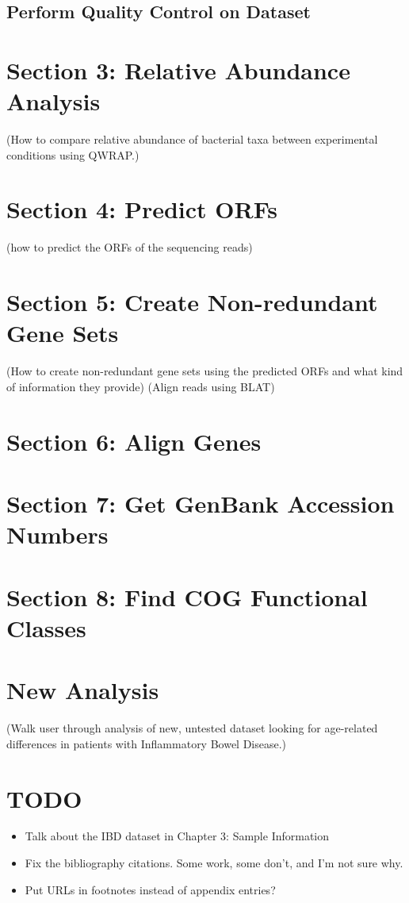     
    \section{Perform Quality Control on Dataset}



\chapter{Section 3: Relative Abundance Analysis}
(How to compare relative abundance of bacterial taxa between experimental conditions using QWRAP.)

\chapter{Section 4: Predict ORFs}
(how to predict the ORFs of the sequencing reads)

\chapter{Section 5: Create Non-redundant Gene Sets}
(How to create non-redundant gene sets using the predicted ORFs and what kind of information they provide)
(Align reads using BLAT)

\chapter{Section 6: Align Genes}

\chapter{Section 7: Get GenBank Accession Numbers}

\chapter{Section 8: Find COG Functional Classes}

\chapter{New Analysis}
(Walk user through analysis of new, untested dataset looking for age-related differences in patients with Inflammatory Bowel Disease.)

\chapter{TODO}
\begin{itemize}
    \item Talk about the IBD dataset in Chapter 3: Sample Information
    \item Fix the bibliography citations. Some work, some don't, and I'm not sure why.
    \item Put URLs in footnotes instead of appendix entries?
\end{itemize}


